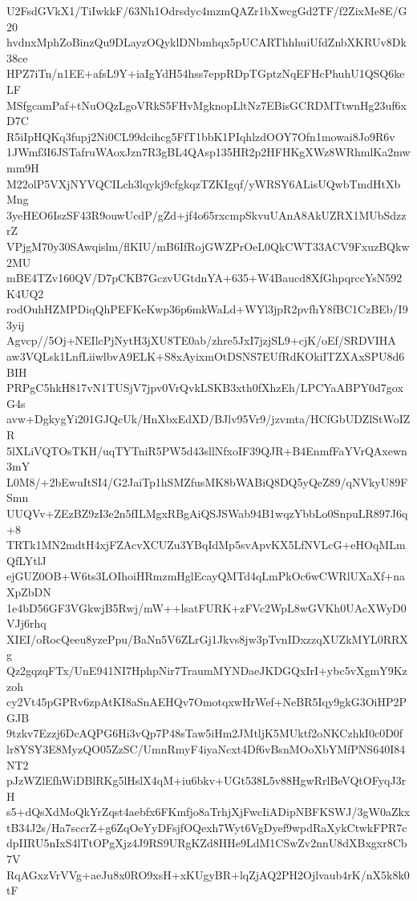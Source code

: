 U2FsdGVkX1/TiIwkkF/63Nh1Odrsdyc4mzmQAZr1bXwcgGd2TF/f2ZixMe8E/G20
hvdnxMphZoBinzQu9DLayzOQyklDNbmhqx5pUCARThhhuiUfdZnbXKRUv8Dk38ce
HPZ7iTn/n1EE+afsL9Y+iaIgYdH54hss7eppRDpTGptzNqEFHcPhuhU1QSQ6keLF
MSfgcamPaf+tNuOQzLgoVRkS5FHvMgknopLltNz7EBisGCRDMTtwnHg23uf6xD7C
R5iIpHQKq3fupj2Ni0CL99dcihcg5FfT1bbK1PIqhlzdOOY7Ofn1mowai8Jo9R6v
1JWmf3I6JSTafruWAoxJzn7R3gBL4QAsp135HR2p2HFHKgXWz8WRhmlKa2mwmm9H
M22olP5VXjNYVQCILch3lqykj9cfgkqzTZKIgqf/yWRSY6ALisUQwbTmdHtXbMng
3yeHEO6IszSF43R9ouwUcdP/gZd+jf4o65rxcmpSkvuUAnA8AkUZRX1MUbSdzzrZ
VPjgM70y30SAwqislm/flKIU/mB6IfRojGWZPrOeL0QkCWT33ACV9FxuzBQkw2MU
mBE4TZv160QV/D7pCKB7GczvUGtdnYA+635+W4Baucd8XfGhpqrccYsN592K4UQ2
rodOuhHZMPDiqQhPEFKeKwp36p6mkWaLd+WYl3jpR2pvfhY8fBC1CzBEb/I93yij
Agvcp//5Oj+NEIlcPjNytH3jXU8TE0ab/zhre5JxI7jzjSL9+cjK/oEf/SRDVIHA
aw3VQLsk1LnfLiiwlbvA9ELK+S8xAyixmOtDSNS7EUfRdKOkiITZXAxSPU8d6BIH
PRPgC5hkH817vN1TUSjV7jpv0VrQvkLSKB3xth0fXhzEh/LPCYaABPY0d7goxG4s
avw+DgkygYi201GJQcUk/HnXbxEdXD/BJlv95Vr9/jzvmta/HCfGbUDZlStWoIZR
5lXLiVQTOsTKH/uqTYTniR5PW5d43sllNfxoIF39QJR+B4EnmfFaYVrQAxewn3mY
L0M8/+2bEwuItSI4/G2JaiTp1hSMZfusMK8bWABiQ8DQ5yQeZ89/qNVkyU89FSmn
UUQVv+ZEzBZ9zI3e2n5fILMgxRBgAiQSJSWab94B1wqzYbbLo0SnpuLR897J6q+8
TRTk1MN2mdtH4xjFZAcvXCUZu3YBqIdMp5svApvKX5LfNVLcG+eHOqMLmQfLYtlJ
ejGUZ0OB+W6ts3LOIhoiHRmzmHglEcayQMTd4qLmPkOc6wCWRlUXaXf+naXpZbDN
1e4bD56GF3VGkwjB5Rwj/mW++lsatFURK+zFVc2WpL8wGVKh0UAcXWyD0VJj6rhq
XIEI/oRocQeeu8yzePpu/BaNn5V6ZLrGj1Jkvs8jw3pTvnIDxzzqXUZkMYL0RRXg
Qz2gqzqFTx/UnE941NI7HphpNir7TraumMYNDaeJKDGQxIrI+ybc5vXgmY9Kzzoh
cy2Vt45pGPRv6zpAtKI8aSnAEHQv7OmotqxwHrWef+NeBR5Iqy9gkG3OiHP2PGJB
9tzkv7Ezzj6DcAQPG6Hi3vQp7P48sTaw5iHm2JMtljK5MUktf2oNKCzhkI0c0D0f
lr8YSY3E8MyzQO05ZzSC/UmnRmyF4iyaNcxt4Df6vBsnMOoXbYMfPNS640I84NT2
pJzWZlEfhWiDBlRKg5lHslX4qM+iu6bkv+UGt538L5v88HgwRrlBeVQtOFyqJ3rH
s5+dQsXdMoQkYrZqst4aebfx6FKmfjo8aTrhjXjFwcIiADipNBFKSWJ/3gW0aZkx
tB34J2s/Ha7sccrZ+g6ZqOeYyDFsjfOQexh7Wyt6VgDyef9wpdRaXykCtwkFPR7c
dpIIRU5nIxS4lTtOPgXjz4J9RS9URgKZd8HHe9LdM1CSwZv2nnU8dXBxgxr8Cb7V
RqAGxzVrVVg+aeJu8x0RO9xsH+xKUgyBR+lqZjAQ2PH2Ojlvaub4rK/nX5k8k0tF
